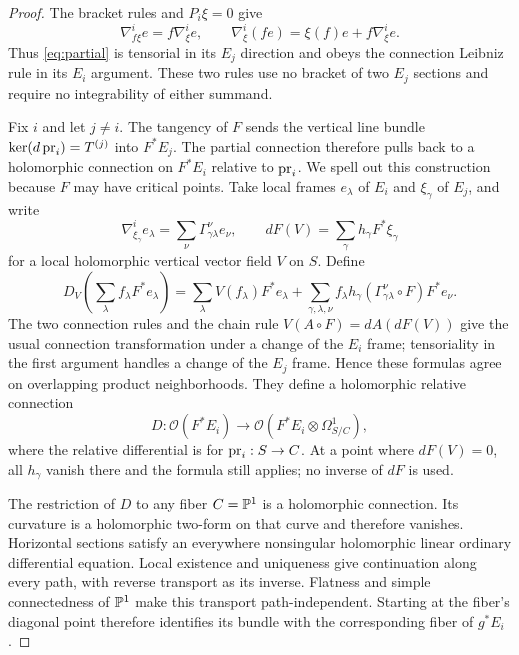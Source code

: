 \begin{proof}
The bracket rules and \(P_i\xi=0\) give
\[
\nabla^i_{f\xi}e=f\nabla^i_\xi e,\qquad
\nabla^i_\xi(fe)=\xi(f)e+f\nabla^i_\xi e.
\]
Thus \eqref{eq:partial} is tensorial in its \(E_j\) direction and obeys
the connection Leibniz rule in its \(E_i\) argument. These two rules
use no bracket of two \(E_j\) sections and require no integrability
of either summand.

Fix \(i\) and let \(j\ne i\). The tangency of \(F\) sends the vertical
line bundle \(\ker(d\operatorname{pr}_i)=T^{(j)}\) into \(F^*E_j\). The partial
connection therefore pulls back to a holomorphic connection on
\(F^*E_i\) relative to \(\operatorname{pr}_i\). We spell out this construction because
\(F\) may have critical points. Take local frames \(e_\lambda\) of
\(E_i\) and \(\xi_\gamma\) of \(E_j\), and write
\[
\nabla^i_{\xi_\gamma}e_\lambda
 =\sum_\nu\Gamma_{\gamma\lambda}^{\nu}e_\nu,\qquad
dF(V)=\sum_\gamma h_\gamma F^*\xi_\gamma
\]
for a local holomorphic vertical vector field \(V\) on \(S\). Define
\[
D_V\!\left(\sum_\lambda f_\lambda F^*e_\lambda\right)
=\sum_\lambda V(f_\lambda)F^*e_\lambda
 +\sum_{\gamma,\lambda,\nu}
 f_\lambda h_\gamma
 (\Gamma_{\gamma\lambda}^{\nu}\circ F)F^*e_\nu.
\]
The two connection rules and the chain rule
\(V(A\circ F)=dA(dF(V))\) give the usual connection transformation
under a change of the \(E_i\) frame; tensoriality in the first argument
handles a change of the \(E_j\) frame. Hence these formulas agree on
overlapping product neighborhoods. They define a holomorphic relative
connection
\[
D:\mathcal O(F^*E_i)\longrightarrow
\mathcal O(F^*E_i\otimes\Omega^1_{S/C}),
\]
where the relative differential is for \(\operatorname{pr}_i:S\to C\). At a point where
\(dF(V)=0\), all \(h_\gamma\) vanish there and the formula still applies;
no inverse of \(dF\) is used.

The restriction of \(D\) to any fiber \(C=\mathbb P^1\) is a holomorphic
connection. Its curvature is a holomorphic two-form on that curve and
therefore vanishes. Horizontal sections satisfy an everywhere nonsingular
holomorphic linear ordinary differential equation. Local existence and
uniqueness give continuation along every path, with reverse transport as
its inverse. Flatness and simple connectedness of \(\mathbb P^1\) make this
transport path-independent. Starting at the fiber's diagonal point
therefore identifies its bundle with the corresponding fiber of
\(g^*E_i\).


\end{proof}
